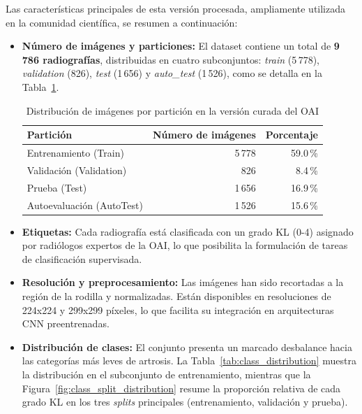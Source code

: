 \documentclass[11pt,spanish,listoffigures,listoftables]{tfgetsinf}
\begin{document}
Las características principales de esta versión procesada, ampliamente utilizada en la comunidad científica, se resumen a continuación:

\begin{itemize}
    \item \textbf{Número de imágenes y particiones:} El dataset contiene un total de \textbf{9\,786 radiografías}, distribuidas en cuatro subconjuntos: \textit{train} (5\,778), \textit{validation} (826), \textit{test} (1\,656) y \textit{auto\_test} (1\,526), como se detalla en la Tabla~\ref{tab:splits}.
    
    \begin{table}[H]
        \centering
        \caption{Distribución de imágenes por partición en la versión curada del OAI}
        \label{tab:splits}
        \begin{tabular}{lrr}
            \toprule
            \textbf{Partición} & \textbf{Número de imágenes} & \textbf{Porcentaje} \\
            \midrule
            Entrenamiento (Train) & 5\,778 & 59.0\,\% \\
            Validación (Validation) & 826 & 8.4\,\% \\
            Prueba (Test) & 1\,656 & 16.9\,\% \\
            Autoevaluación (AutoTest) & 1\,526 & 15.6\,\% \\
            \bottomrule
        \end{tabular}
    \end{table}

    \item \textbf{Etiquetas:} Cada radiografía está clasificada con un grado KL (0-4) asignado por radiólogos expertos de la OAI, lo que posibilita la formulación de tareas de clasificación supervisada.

    \item \textbf{Resolución y preprocesamiento:} Las imágenes han sido recortadas a la región de la rodilla y normalizadas. Están disponibles en resoluciones de 224x224 y 299x299 píxeles, lo que facilita su integración en arquitecturas CNN preentrenadas.

    \item \textbf{Distribución de clases:} El conjunto presenta un marcado desbalance hacia las categorías más leves de artrosis. La Tabla~\ref{tab:class_distribution} muestra la distribución en el subconjunto de entrenamiento, mientras que la Figura~\ref{fig:class_split_distribution} resume la proporción relativa de cada grado KL en los tres \textit{splits} principales (entrenamiento, validación y prueba).


\end{itemize}
\end{document}
